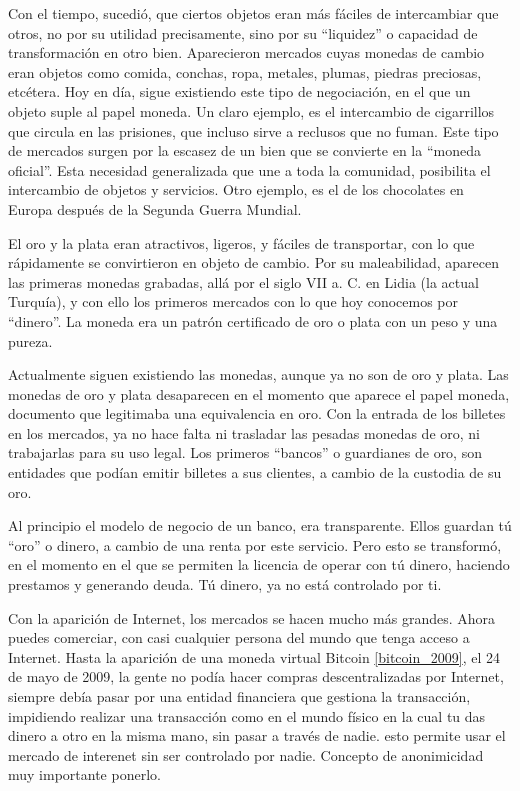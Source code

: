 Con el tiempo, sucedió, que ciertos objetos eran más fáciles de intercambiar que otros, no por su utilidad precisamente, sino por su ``liquidez'' o capacidad de transformación en otro bien.  Aparecieron mercados cuyas monedas de cambio eran objetos como comida, conchas, ropa, metales, plumas, piedras preciosas, etcétera. Hoy en día, sigue existiendo este tipo de negociación, en el que un objeto suple al papel moneda. Un claro ejemplo, es el intercambio de cigarrillos que circula en las prisiones, que incluso sirve a reclusos que no fuman. Este tipo de mercados surgen por la escasez de un bien que se convierte en la ``moneda oficial''. Esta necesidad generalizada que une a toda la comunidad, posibilita el intercambio de objetos y servicios. Otro ejemplo, es el de los chocolates en Europa después de la Segunda Guerra Mundial.

El oro y la plata eran atractivos, ligeros, y fáciles de transportar, con lo que rápidamente se convirtieron en objeto de cambio. Por su maleabilidad, aparecen las primeras monedas grabadas, allá por el siglo VII a. C. en Lidia (la actual Turquía), y con ello los primeros mercados con lo que hoy conocemos por ``dinero''. La moneda era un patrón certificado de oro o plata con un peso y una pureza. 

Actualmente siguen existiendo las monedas, aunque ya no son de oro y plata. Las monedas de oro y plata desaparecen en el momento que aparece el papel moneda, documento que legitimaba una equivalencia en oro. Con la entrada de los billetes en los mercados, ya no hace falta ni trasladar las pesadas monedas de oro, ni trabajarlas para su uso legal. Los primeros ``bancos'' o guardianes de oro, son entidades que podían emitir billetes a sus clientes, a cambio de la custodia de su oro.

Al principio el modelo de negocio de un banco, era transparente. Ellos guardan tú ``oro'' o dinero, a cambio de una renta por este servicio. Pero esto se transformó, en el momento en el que se permiten la licencia de operar con tú dinero, haciendo prestamos y generando deuda. Tú dinero, ya no está controlado por ti.
 
Con la aparición de Internet, los mercados se hacen mucho más grandes. Ahora puedes comerciar, con casi cualquier persona del mundo que tenga acceso a Internet. Hasta la aparición de una moneda virtual Bitcoin \ref{bitcoin_2009}, el 24 de mayo de 2009, la gente no podía hacer compras descentralizadas por Internet, siempre debía pasar por una entidad financiera que gestiona la transacción, impidiendo realizar una transacción como en el mundo físico en la cual tu das dinero a otro en la misma mano, sin pasar a través de nadie. esto permite usar el mercado de interenet sin ser controlado por nadie. Concepto de anonimicidad muy importante ponerlo.

